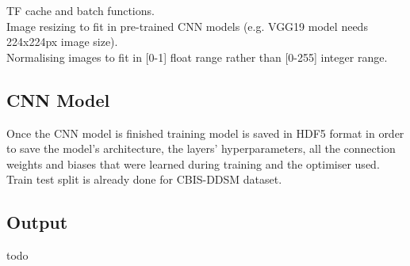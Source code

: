 TF cache and batch functions.\\

Image resizing to fit in pre-trained CNN models (e.g. VGG19 model needs 224x224px image size).\\

Normalising images to fit in [0-1] float range rather than [0-255] integer range.


\subsection{CNN Model}

Once the CNN model is finished training model is saved in HDF5 format in order to save the model's architecture, the layers' hyperparameters, all the connection weights and biases that were learned during training \cite{Geron2019} and the optimiser used.\\

Train test split is already done for CBIS-DDSM dataset.


\subsection{Output}

todo
